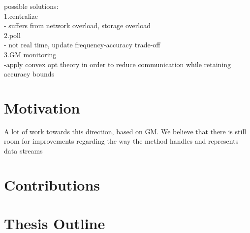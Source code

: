 possible solutions:\\
	1.centralize\\
		- suffers from network overload, storage overload\\
	2.poll\\
		- not real time, update frequency-accuracy trade-off\\
	3.GM monitoring\\
	    -apply convex opt theory in order to reduce communication while retaining accuracy bounds

\section{Motivation} \label{sec:intro-motivation}

A lot of work towards this direction, based on GM.
We believe that there is still room for improvements regarding the way the method handles and represents data streams

\section{Contributions} \label{sec:intro-contr}

\section{Thesis Outline} \label{sec:intro-thesisOutline}